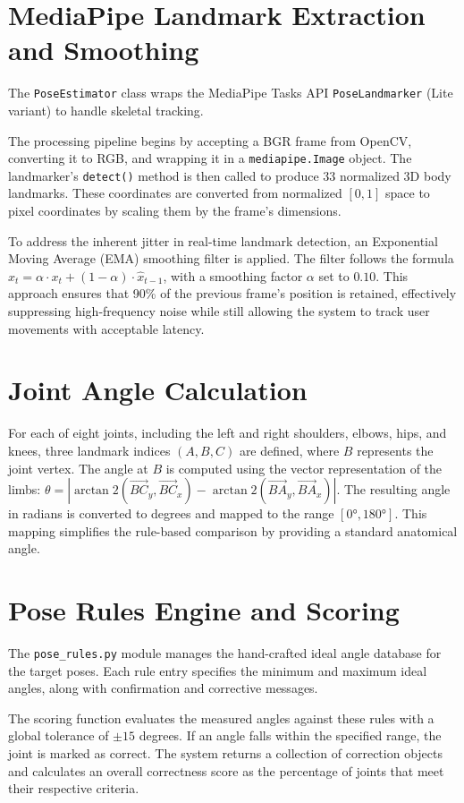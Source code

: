\section{MediaPipe Landmark Extraction and Smoothing}
The \texttt{PoseEstimator} class wraps the MediaPipe Tasks API \texttt{PoseLandmarker} (Lite variant) to handle skeletal tracking.

The processing pipeline begins by accepting a BGR frame from OpenCV, converting it to RGB, and wrapping it in a \texttt{mediapipe.Image} object. The landmarker's \texttt{detect()} method is then called to produce 33 normalized 3D body landmarks. These coordinates are converted from normalized $[0,1]$ space to pixel coordinates by scaling them by the frame's dimensions.

To address the inherent jitter in real-time landmark detection, an Exponential Moving Average (EMA) smoothing filter is applied. The filter follows the formula $\hat{x}_t = \alpha \cdot x_t + (1 - \alpha) \cdot \hat{x}_{t-1}$, with a smoothing factor $\alpha$ set to $0.10$. This approach ensures that 90\% of the previous frame's position is retained, effectively suppressing high-frequency noise while still allowing the system to track user movements with acceptable latency.

\section{Joint Angle Calculation}
For each of eight joints, including the left and right shoulders, elbows, hips, and knees, three landmark indices $(A, B, C)$ are defined, where $B$ represents the joint vertex. The angle at $B$ is computed using the vector representation of the limbs: $\theta = \left| \arctan2\left(\vec{BC}_y, \vec{BC}_x\right) - \arctan2\left(\vec{BA}_y, \vec{BA}_x\right) \right|$. The resulting angle in radians is converted to degrees and mapped to the range $[0°, 180°]$. This mapping simplifies the rule-based comparison by providing a standard anatomical angle.

\section{Pose Rules Engine and Scoring}
The \texttt{pose\_rules.py} module manages the hand-crafted ideal angle database for the target poses. Each rule entry specifies the minimum and maximum ideal angles, along with confirmation and corrective messages.

The scoring function evaluates the measured angles against these rules with a global tolerance of $\pm 15$ degrees. If an angle falls within the specified range, the joint is marked as correct. The system returns a collection of correction objects and calculates an overall correctness score as the percentage of joints that meet their respective criteria.

